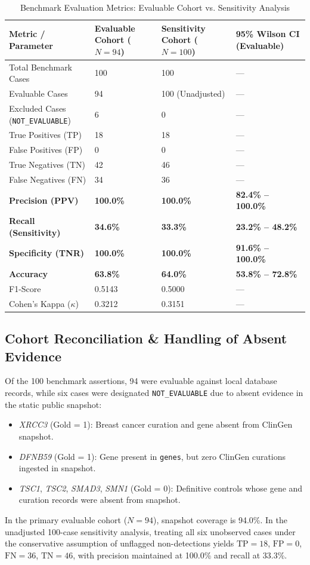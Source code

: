 \documentclass[conference]{IEEEtran}
\begin{document}
\begin{table}[t]
\caption{Benchmark Evaluation Metrics: Evaluable Cohort vs. Sensitivity Analysis}
\label{tab:benchmark}
\centering
\begin{tabularx}{\columnwidth}{lXXX}
\toprule
\textbf{Metric / Parameter} & \textbf{Evaluable Cohort ($N = 94$)} & \textbf{Sensitivity Cohort ($N = 100$)} & \textbf{95\% Wilson CI (Evaluable)} \\
\midrule
Total Benchmark Cases & 100 & 100 & --- \\
Evaluable Cases & 94 & 100 (Unadjusted) & --- \\
Excluded Cases (\texttt{NOT\_EVALUABLE}) & 6 & 0 & --- \\
True Positives (TP) & 18 & 18 & --- \\
False Positives (FP) & 0 & 0 & --- \\
True Negatives (TN) & 42 & 46 & --- \\
False Negatives (FN) & 34 & 36 & --- \\
\textbf{Precision (PPV)} & \textbf{100.0\%} & \textbf{100.0\%} & \textbf{82.4\% -- 100.0\%} \\
\textbf{Recall (Sensitivity)} & \textbf{34.6\%} & \textbf{33.3\%} & \textbf{23.2\% -- 48.2\%} \\
\textbf{Specificity (TNR)} & \textbf{100.0\%} & \textbf{100.0\%} & \textbf{91.6\% -- 100.0\%} \\
\textbf{Accuracy} & \textbf{63.8\%} & \textbf{64.0\%} & \textbf{53.8\% -- 72.8\%} \\
F1-Score & 0.5143 & 0.5000 & --- \\
Cohen's Kappa ($\kappa$) & 0.3212 & 0.3151 & --- \\
\bottomrule
\end{tabularx}
\end{table}

\subsection{Cohort Reconciliation & Handling of Absent Evidence}
Of the 100 benchmark assertions, 94 were evaluable against local database records, while six cases were designated \texttt{NOT\_EVALUABLE} due to absent evidence in the static public snapshot:
\begin{itemize}
    \item \textit{XRCC3} (Gold = 1): Breast cancer curation and gene absent from ClinGen snapshot.
    \item \textit{DFNB59} (Gold = 1): Gene present in \texttt{genes}, but zero ClinGen curations ingested in snapshot.
    \item \textit{TSC1}, \textit{TSC2}, \textit{SMAD3}, \textit{SMN1} (Gold = 0): Definitive controls whose gene and curation records were absent from snapshot.
\end{itemize}
In the primary evaluable cohort ($N = 94$), snapshot coverage is 94.0\%. In the unadjusted 100-case sensitivity analysis, treating all six unobserved cases under the conservative assumption of unflagged non-detections yields $\text{TP}=18$, $\text{FP}=0$, $\text{FN}=36$, $\text{TN}=46$, with precision maintained at 100.0\% and recall at 33.3\%.
\end{document}
